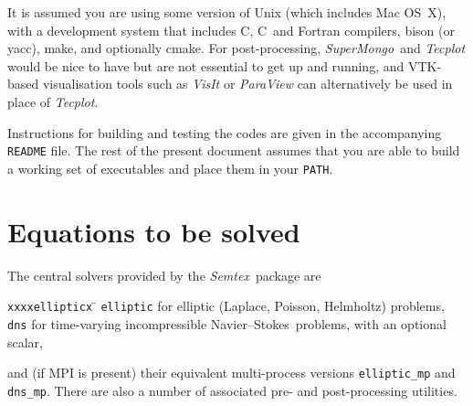 \documentclass[11pt]{report}
\newcommand{\Semtex}{\emph{Semtex}} \newcommand{\Dog}{\emph{Dog}}
\newcommand{\SM}{\emph{SuperMongo}}
\newcommand\NavSto{Navier--Stokes}
\newcommand\cpp{C\nolinebreak\hspace{-.05em}\raisebox{.3ex}{\footnotesize\bf
+}\nolinebreak\hspace{-.10em}\raisebox{.3ex}{\footnotesize\bf+}}
\begin{document}
It is assumed you are using some version of Unix (which includes Mac
OS~X), with a development system that includes C, \cpp\ and Fortran
compilers, bison (or yacc), make, and optionally cmake. For
post-processing, \SM\ and \emph{Tecplot} would be nice to have but are
not essential to get up and running, and VTK-based visualisation tools
such as \emph{VisIt} or \emph{ParaView} can alternatively be used in
place of \emph{Tecplot}.

Instructions for building and testing the codes are given in the
accompanying \texttt{README} file.  The rest of the present document
assumes that you are able to build a working set of executables and
place them in your \texttt{PATH}.

\section{Equations to be solved}

The central solvers provided by the \Semtex\ package are
\begin{tabbing}
\texttt{xxxxellipticx} \= \kill
\hspace*{4ex}\texttt{elliptic} \> for elliptic (Laplace, Poisson, Helmholtz)
problems,\\
\hspace*{4ex}\texttt{dns} \> for time-varying incompressible
\NavSto\ problems, with an optional scalar,
\end{tabbing}
and (if MPI is present) their equivalent multi-process versions
\texttt{elliptic\_mp} and \texttt{dns\_mp}.  There are also a number
of associated pre- and post-processing utilities.
\end{document}
